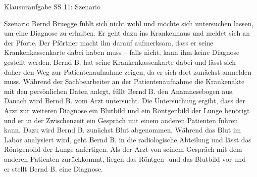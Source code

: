 \documentclass[18pt]{beamer}
\begin{document}
\begin{frame}{Klausuraufgabe SS 11: Szenario}
\begin{block}{Szenario}
	\small Bernd Bruegge fühlt sich nicht wohl und möchte sich untersuchen lassen, um eine Diagnose zu erhalten. Er geht dazu ins Krankenhaus und meldet sich an der Pforte. Der
	Pförtner macht ihn darauf aufmerksam, dass er seine Krankenkassenkarte dabei haben
	muss – falls nicht, kann ihm keine Diagnose gestellt werden. Bernd B. hat seine Krankenkassenkarte dabei und lässt sich daher den Weg zur Patientenaufnahme zeigen, da
	er sich dort zunächst anmelden muss. Während der Sachbearbeiter an der Patientenaufnahme die Krankenakte mit den persönlichen Daten anlegt, füllt Bernd B. den
	Anamnesebogen aus. Danach wird Bernd B. vom Arzt untersucht. Die Untersuchung
	ergibt, dass der Arzt zur weiteren Diagnose ein Blutbild und ein Röntgenbild der Lunge
	benötigt und er in der Zwischenzeit ein Gespräch mit einem anderen Patienten führen
	kann. Dazu wird Bernd B. zunächst Blut abgenommen. Während das Blut im Labor
	analysiert wird, geht Bernd B. in die radiologische Abteilung und lässt das Röntgenbild
	der Lunge anfertigen. Als der Arzt von seinem Gespräch mit dem anderen Patienten zurückkommt, liegen das Röntgen- und das Blutbild vor und er stellt Bernd B. eine Diagnose.
\end{block}
\end{frame}
\end{document}
